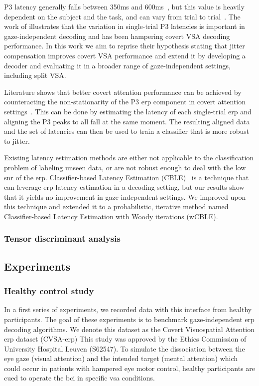 P3 latency generally falls between 350ms and 600ms~\cite{Luck2014}, but this
value is heavily dependent on the subject and the task, and can vary from trial
to trial~\cite{Ouyang2017}.
The work of \cite{Arico2014} illustrates that the variation in single-trial P3
latencies is important in gaze-independent decoding and has been hampering covert
VSA decoding performance.
In this work we aim to reprise their hypothesis stating that jitter compensation improves
covert VSA performance and extend it by developing a decoder and evaluating it
in a broader range of gaze-independent settings, including split VSA.


Literature shows that better covert attention performance can be achieved by
counteracting the non-stationarity of the P3 \ac{erp} component in covert
attention settings~\cite{Arico2014}.
This can be done by estimating the latency of each single-trial \ac{erp} and aligning
the P3 peaks to all fall at the same moment.
The resulting aligned data and the set of latencies can then be used to train a
classifier that is more robust to jitter.

Existing latency estimation methods are either not applicable to the
classification problem of labeling unseen data, or are not robust enough to
deal with the low \ac{snr} of the \ac{erp}.
Classifier-based Latency Estimation (CBLE)~\cite{Mowla2017} is a technique that can leverage
\ac{erp} latency estimation in a decoding setting, but our results show that it
yields no improvement in gaze-independent settings.
We improved upon this technique and extended it to a probabilistic, iterative
method named Classifier-based Latency Estimation with Woody iterations (wCBLE).

\subsubsection{Tensor discriminant analysis}

\subsection{Experiments}

\subsubsection{Healthy control study}
In a first series of experiments, we recorded data with this interface from healthy participants.
The goal of these experiments is to benchmark
gaze-independent \ac{erp} decoding algorithms.
We denote this dataset as the Covert Visuospatial Attention \ac{erp} dataset
(CVSA-\ac{erp})
This study was approved by the Ethics Commission of University Hospital Leuven
(S62547).
To simulate the dissociation between the eye gaze (visual attention) and the
intended target (mental attention) which could occur in patients with hampered eye
motor control, healthy participants are cued to operate the \ac{bci} in specific
\ac{vsa} conditions.

